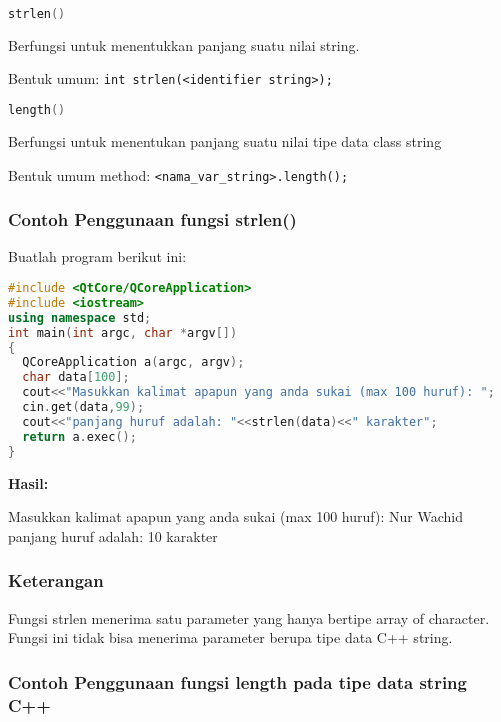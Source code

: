 \begin{lstlisting}[language=c++, numbers=none]
strlen()
\end{lstlisting}

Berfungsi untuk menentukkan panjang suatu nilai string.

Bentuk umum:
\texttt{int\ strlen(\textless{}identifier\ string\textgreater{});}

\begin{lstlisting}[language=c++, numbers=none]
length()
\end{lstlisting}

Berfungsi untuk menentukan panjang suatu nilai tipe data class string

Bentuk umum method:
\texttt{\textless{}nama\_var\_string\textgreater{}.length();}

\subsubsection*{Contoh  Penggunaan fungsi strlen()}

Buatlah program berikut ini:

\begin{lstlisting}[language=c++, caption=Penggunaan fungsi strlen(), label=contoh3-19]
#include <QtCore/QCoreApplication>
#include <iostream>
using namespace std;
int main(int argc, char *argv[])
{
  QCoreApplication a(argc, argv);
  char data[100];
  cout<<"Masukkan kalimat apapun yang anda sukai (max 100 huruf): ";
  cin.get(data,99);
  cout<<"panjang huruf adalah: "<<strlen(data)<<" karakter";
  return a.exec();
}
\end{lstlisting}

\textbf{Hasil:}

\begin{lcverbatim}
Masukkan kalimat apapun
yang anda sukai (max 100 huruf): Nur Wachid 
panjang huruf adalah: 10 karakter
\end{lcverbatim}
 

\subsubsection*{Keterangan}

Fungsi strlen menerima satu parameter yang hanya bertipe array of
character. Fungsi ini tidak bisa menerima parameter berupa tipe data C++
string.

\subsubsection*{Contoh  Penggunaan fungsi length pada tipe data string C++}

